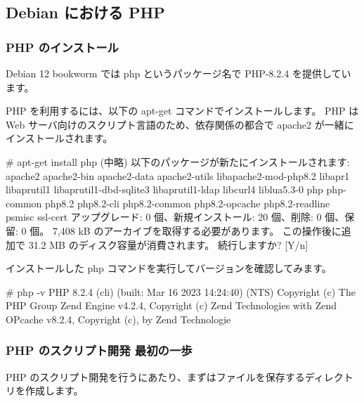 \documentclass[mingoth,a4paper]{jsarticle}
\begin{document}
\subsection{Debian における PHP}

\subsubsection{PHP のインストール}

Debian 12 bookworm では php というパッケージ名で PHP-8.2.4 を提供しています。

PHP を利用するには、以下の apt-get コマンドでインストールします。
PHP は Web サーバ向けのスクリプト言語のため、依存関係の都合で apache2 が一緒にインストールされます。

\begin{commandline}
# apt-get install php
  (中略)
以下のパッケージが新たにインストールされます:
  apache2 apache2-bin apache2-data apache2-utils libapache2-mod-php8.2 libapr1
  libaprutil1 libaprutil1-dbd-sqlite3 libaprutil1-ldap libcurl4 liblua5.3-0
  php php-common php8.2 php8.2-cli php8.2-common php8.2-opcache
  php8.2-readline psmisc ssl-cert
アップグレード: 0 個、新規インストール: 20 個、削除: 0 個、保留: 0 個。
7,408 kB のアーカイブを取得する必要があります。
この操作後に追加で 31.2 MB のディスク容量が消費されます。
続行しますか? [Y/n]
\end{commandline}

インストールした php コマンドを実行してバージョンを確認してみます。

\begin{commandline}
# php -v
PHP 8.2.4 (cli) (built: Mar 16 2023 14:24:40) (NTS)
Copyright (c) The PHP Group
Zend Engine v4.2.4, Copyright (c) Zend Technologies
    with Zend OPcache v8.2.4, Copyright (c), by Zend Technologie
\end{commandline}


\subsubsection{PHP のスクリプト開発 最初の一歩}


PHP のスクリプト開発を行うにあたり、まずはファイルを保存するディレクトリを作成します。

\end{document}
